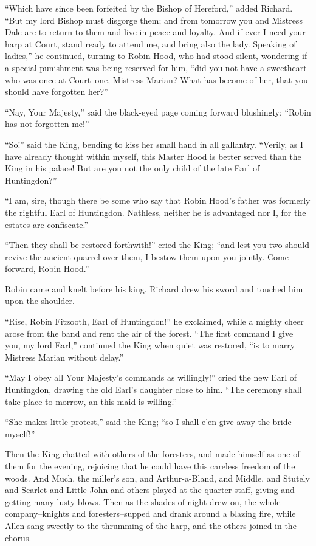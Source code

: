 ``Which have since been forfeited by the Bishop of Hereford,'' added
Richard. ``But my lord Bishop must disgorge them; and from tomorrow you
and Mistress Dale are to return to them and live in peace and loyalty.
And if ever I need your harp at Court, stand ready to attend me, and
bring also the lady. Speaking of ladies,'' he continued, turning to
Robin Hood, who had stood silent, wondering if a special punishment was
being reserved for him, ``did you not have a sweetheart who was once at
Court--one, Mistress Marian? What has become of her, that you should
have forgotten her?''

``Nay, Your Majesty,'' said the black-eyed page coming forward
blushingly; ``Robin has not forgotten me!''

``So!'' said the King, bending to kiss her small hand in all gallantry.
``Verily, as I have already thought within myself, this Master Hood is
better served than the King in his palace! But are you not the only
child of the late Earl of Huntingdon?''

``I am, sire, though there be some who say that Robin Hood's father was
formerly the rightful Earl of Huntingdon. Nathless, neither he is
advantaged nor I, for the estates are confiscate.''

``Then they shall be restored forthwith!'' cried the King; ``and lest
you two should revive the ancient quarrel over them, I bestow them upon
you jointly. Come forward, Robin Hood.''

Robin came and knelt before his king. Richard drew his sword and touched
him upon the shoulder.

``Rise, Robin Fitzooth, Earl of Huntingdon!'' he exclaimed, while a
mighty cheer arose from the band and rent the air of the forest. ``The
first command I give you, my lord Earl,'' continued the King when quiet
was restored, ``is to marry Mistress Marian without delay.''

``May I obey all Your Majesty's commands as willingly!'' cried the new
Earl of Huntingdon, drawing the old Earl's daughter close to him. ``The
ceremony shall take place to-morrow, an this maid is willing.''

``She makes little protest,'' said the King; ``so I shall e'en give away
the bride myself!''

Then the King chatted with others of the foresters, and made himself as
one of them for the evening, rejoicing that he could have this careless
freedom of the woods. And Much, the miller's son, and Arthur-a-Bland,
and Middle, and Stutely and Scarlet and Little John and others played at
the quarter-staff, giving and getting many lusty blows. Then as the
shades of night drew on, the whole company--knights and
foresters--supped and drank around a blazing fire, while Allen sang
sweetly to the thrumming of the harp, and the others joined in the
chorus.

